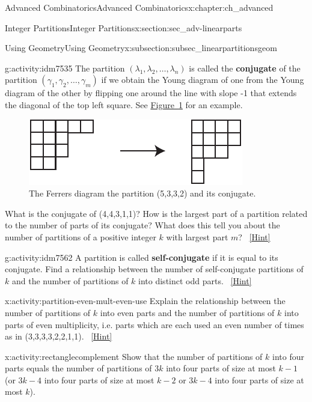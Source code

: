 \documentclass[oneside,10pt,]{book}
\newcommand{\terminology}[1]{\textbf{#1}}
\numberwithin{equation}{chapter}
\begin{document}
\begin{chapterptx}{Advanced Combinatorics}{}{Advanced Combinatorics}{}{}{x:chapter:ch_advanced}
\begin{sectionptx}{Integer Partitions}{}{Integer Partitions}{}{}{x:section:sec_adv-linearparts}
\begin{subsectionptx}{Using Geometry}{}{Using Geometry}{}{}{x:subsection:subsec_linearpartitionsgeom}
\begin{introduction}{}
\begin{activity}{}{g:activity:idm7535}
The partition \((\lambda_1,\lambda_2,\ldots, \lambda_n)\) is called the \terminology{conjugate} of the partition \((\gamma_1,\gamma_2,\ldots, \gamma_m)\) if we obtain the Young diagram of one from the Young diagram of the other by flipping one around the line with slope -1 that extends the diagonal of the top left square. See \hyperref[x:figure:conjugateYoung]{Figure~\ref{x:figure:conjugateYoung}} for an example.%
\begin{figure}
\centering
\includegraphics[width=0.5\linewidth]{images/conjugateYoung}
\caption{The Ferrers diagram the partition (5,3,3,2) and its conjugate.\label{x:figure:conjugateYoung}}
\end{figure}
What is the conjugate of (4,4,3,1,1)? How is the largest part of a partition related to the number of parts of its conjugate? What does this tell you about the number of partitions of a positive integer \(k\) with largest part \(m\)?%
\qquad~\hfill{\tiny\hyperlink{g:hint:idm7553-back}{[Hint]}}\end{activity}
\begin{activity}{}{g:activity:idm7562}%
A partition is called \terminology{self-conjugate} if it is equal to its conjugate. Find a relationship between the number of self-conjugate partitions of \(k\) and the number of partitions of \(k\) into distinct odd parts.%
\qquad~\hfill{\tiny\hyperlink{g:hint:idm7573-back}{[Hint]}}\end{activity}
\begin{activity}{}{x:activity:partition-even-mult-even-use}%
Explain the relationship between the number of partitions of \(k\) into even parts and the number of partitions of \(k\) into parts of even multiplicity, i.e. parts which are each used an even number of times as in (3,3,3,3,2,2,1,1).%
\qquad~\hfill{\tiny\hyperlink{g:hint:idm7595-back}{[Hint]}}\end{activity}
\begin{activity}{}{x:activity:rectanglecomplement}%
Show that the number of partitions of \(k\) into four parts equals the number of partitions of \(3k\) into four parts of size at most \(k-1\) (or \(3k-4\) into four parts of size at most \(k-2\) or \(3k-4\) into four parts of size at most \(k\)).%

\end{activity}
\end{introduction}
\end{subsectionptx}
\end{sectionptx}
\end{chapterptx}
\end{document}
